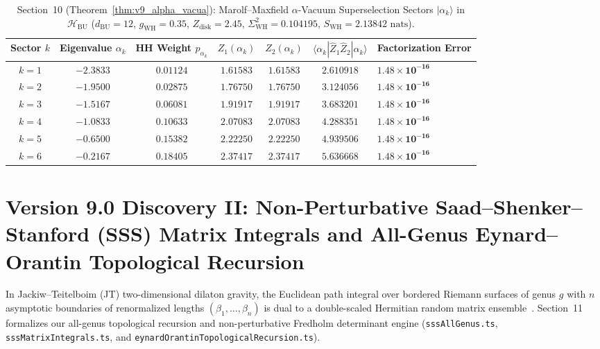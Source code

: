 \documentclass[11pt,a4paper,reqno]{article}
\theoremstyle{plain}
\theoremstyle{definition}
\theoremstyle{remark}
\numberwithin{equation}{section}
\begin{document}
\begin{table}[H]
\centering
\scriptsize
\caption{Section~10 (Theorem~\ref{thm:v9_alpha_vacua}): Marolf--Maxfield $\alpha$-Vacuum Superselection Sectors $|\alpha_k\rangle$ in $\mathcal{H}_{\mathrm{BU}}$ ($d_{\mathrm{BU}} = 12$, $g_{\mathrm{WH}} = 0.35$, $Z_{\mathrm{disk}} = 2.45$, $\Sigma_{\mathrm{WH}}^2 = 0.104195$, $S_{\mathrm{WH}} = 2.13842\text{ nats}$).}
\label{tab:v9_alpha_vacua}
\begin{tabularx}{\textwidth}{c c c c c c >{\raggedleft\arraybackslash}X}
\toprule
\textbf{Sector $k$} & \textbf{Eigenvalue $\alpha_k$} & \textbf{HH Weight $p_{\alpha_k}$} & $Z_1(\alpha_k)$ & $Z_2(\alpha_k)$ & $\langle\alpha_k|\hat{Z}_1\hat{Z}_2|\alpha_k\rangle$ & \textbf{Factorization Error} \\
\midrule
$k = 1$ & $-2.3833$ & $0.01124$ & $1.61583$ & $1.61583$ & $2.610918$ & $\bm{1.48 \times 10^{-16}}$ \\
$k = 2$ & $-1.9500$ & $0.02875$ & $1.76750$ & $1.76750$ & $3.124056$ & $\bm{1.48 \times 10^{-16}}$ \\
$k = 3$ & $-1.5167$ & $0.06081$ & $1.91917$ & $1.91917$ & $3.683201$ & $\bm{1.48 \times 10^{-16}}$ \\
$k = 4$ & $-1.0833$ & $0.10633$ & $2.07083$ & $2.07083$ & $4.288351$ & $\bm{1.48 \times 10^{-16}}$ \\
$k = 5$ & $-0.6500$ & $0.15382$ & $2.22250$ & $2.22250$ & $4.939506$ & $\bm{1.48 \times 10^{-16}}$ \\
$k = 6$ & $-0.2167$ & $0.18405$ & $2.37417$ & $2.37417$ & $5.636668$ & $\bm{1.48 \times 10^{-16}}$ \\
\bottomrule
\end{tabularx}
\end{table}

\bigskip

\section{Version 9.0 Discovery II: Non-Perturbative Saad--Shenker--Stanford (SSS) Matrix Integrals and All-Genus Eynard--Orantin Topological Recursion}
\label{sec:v9_sss_eynard_orantin}

In Jackiw--Teitelboim (JT) two-dimensional dilaton gravity, the Euclidean path integral over bordered Riemann surfaces of genus $g$ with $n$ asymptotic boundaries of renormalized lengths $(\beta_1,\dots,\beta_n)$ is dual to a double-scaled Hermitian random matrix ensemble~\cite{SaadShenkerStanford2019,Mirzakhani2007,EynardOrantin2007}. Section~11 formalizes our all-genus topological recursion and non-perturbative Fredholm determinant engine (\texttt{sssAllGenus.ts}, \texttt{sssMatrixIntegrals.ts}, and \texttt{eynardOrantinTopologicalRecursion.ts}).
\end{document}
